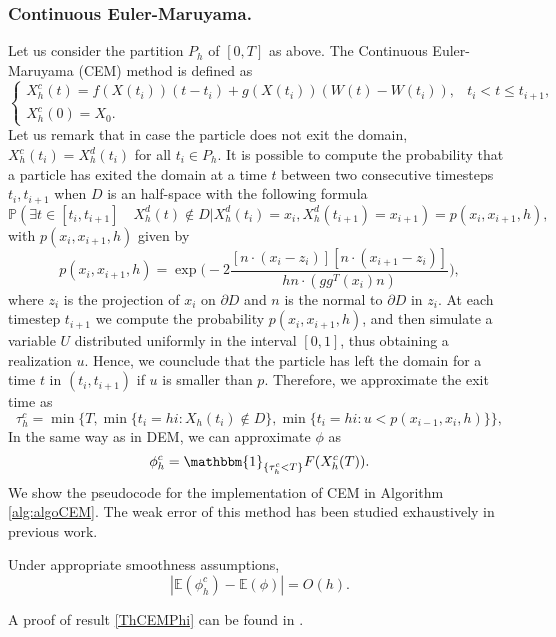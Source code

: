 \subsubsection{Continuous Euler-Maruyama. }
Let us consider the partition $P_h$ of $[0,T]$ as above. The Continuous Euler-Maruyama (CEM) method is defined as
\begin{equation}\label{eq:CEM}
	\begin{cases}
		X_h^c(t) = f(X(t_i))(t-t_i) + g(X(t_i))(W(t) - W(t_{i})),  & t_i < t \leq t_{i+1},\\
		X_h^c(0) = X_0.
	\end{cases}
\end{equation} 
Let us remark that in case the particle does not exit the domain, $X_h^c(t_i) = X_h^d(t_i)$ for all $t_i \in P_h$. It is possible to compute the probability that a particle has exited the domain at a time $t$ between two consecutive timesteps $t_i,t_{i+1}$ when $D$ is an half-space with the following formula \cite{Gobet2001}
\begin{equation}\label{eq:CEMProb}
	\mathbb{P} (\exists t \in [ t_i,t_{i+1} ] \quad X_h^d(t) \notin D | X_h^d(t_i) = x_i, X_h^d(t_{i+1}) = x_{i+1}) = p(x_i,x_{i+1},h),
\end{equation}
with $p(x_i,x_{i+1},h)$ given by
\begin{equation}\label{eq:CEMProbHalfSpace}
	p(x_i,x_{i+1},h) = \exp\Big(-2\frac{[n\cdot(x_i - z_i)][n\cdot(x_{i+1} - z_i)]}{hn\cdot (gg^T(x_i)n)}\Big),
\end{equation}
where $z_i$ is the projection of $x_i$ on $\partial D$ and $n$ is the normal to $\partial D$ in $z_i$. At each timestep $t_{i+1}$ we compute the probability $p(x_i,x_{i+1},h)$, and then simulate a variable $U$ distributed uniformly in the interval $\left[0,1\right]$, thus obtaining a realization $u$. Hence, we counclude that the particle has left the domain for a time $t$ in $(t_i,t_{i+1})$ if $u$ is smaller than $p$. Therefore, we approximate the exit time as
\begin{equation}\label{eq:TauCEM}
	\tau_h^c = \min \{T,\min\{t_i = hi \colon X_h(t_i) \notin D\}, \min\{t_i = hi \colon u < p(x_{i-1},x_i,h) \}\},
\end{equation}
In the same way as in DEM, we can approximate $\phi$ as
\begin{equation}\label{eq:PhiCEM}
	\phi_h^c = \mathbbm{1}_{\{\tau_h^c < T\}}F(X_h^c(T)).
\end{equation}
We show the pseudocode for the implementation of CEM in Algorithm \ref{alg:algoCEM}. The weak error of this method has been studied exhaustively in previous work.
\begin{theorem}\label{ThCEMPhi} Under appropriate smoothness assumptions, 
\begin{equation}\label{eq:ConvCEMPhi}
	|\mathbb{E}(\phi_h^c) - \mathbb{E}(\phi)| = O(h).
\end{equation}
\end{theorem}
A proof of result \ref{ThCEMPhi} can be found in \cite{Gobet2001}. \\

